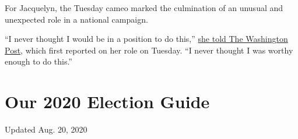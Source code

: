 For Jacquelyn, the Tuesday cameo marked the culmination of an unusual
and unexpected role in a national campaign.

``I never thought I would be in a position to do this,''
\href{https://www.washingtonpost.com/politics/the-security-guard-blurted-i-love-you-to-joe-biden-in-an-elevator-one-viral-video-later-she-will-nominate-him-for-president/2020/08/18/df652f04-e178-11ea-b69b-64f7b0477ed4_story.html}{she
told The Washington Post}, which first reported on her role on Tuesday.
``I never thought I was worthy enough to do this.''

\hypertarget{our-2020-election-guide}{%
\section{Our 2020 Election Guide}\label{our-2020-election-guide}}

Updated Aug. 20, 2020

